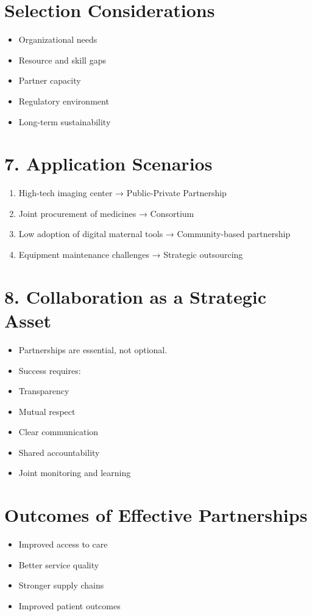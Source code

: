 \documentclass[10pt]{article}
\begin{document}
\section*{Selection Considerations}
\begin{itemize}
  \item Organizational needs
  \item Resource and skill gaps
  \item Partner capacity
  \item Regulatory environment
  \item Long-term sustainability
\end{itemize}

\section*{7. Application Scenarios}
\begin{enumerate}
  \item High-tech imaging center → Public-Private Partnership
  \item Joint procurement of medicines → Consortium
  \item Low adoption of digital maternal tools → Community-based partnership
  \item Equipment maintenance challenges → Strategic outsourcing
\end{enumerate}

\section*{8. Collaboration as a Strategic Asset}
\begin{itemize}
  \item Partnerships are essential, not optional.
  \item Success requires:
  \item Transparency
  \item Mutual respect
  \item Clear communication
  \item Shared accountability
  \item Joint monitoring and learning
\end{itemize}

\section*{Outcomes of Effective Partnerships}
\begin{itemize}
  \item Improved access to care
  \item Better service quality
  \item Stronger supply chains
  \item Improved patient outcomes
\end{itemize}
\end{document}
